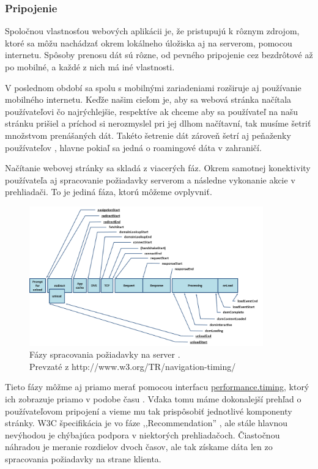 
\newpage
\subsubsection{Pripojenie} %
\label{ssub:pripojenie}

Spoločnou vlastnosťou webových aplikácii je, že pristupujú k rôznym zdrojom, ktoré sa môžu nachádzať okrem lokálneho úložiska aj na serverom, pomocou internetu. Spôsoby prenosu dát sú rôzne, od pevného pripojenie cez bezdrôtové až po mobilné, a každé z nich má iné vlastnosti.

V poslednom období sa spolu s mobilnými zariadeniami rozširuje aj používanie mobilného internetu. Keďže našim cieľom je, aby sa webová stránka načítala používateľovi čo najrýchlejšie, respektíve ak chceme aby sa používateľ na našu stránku prišiel a príchod si nerozmyslel pri jej dlhom načítavní, tak musíme šetriť množstvom prenášaných dát. Takéto šetrenie dát zároveň šetrí aj peňaženky používateľov \cite{performance}, hlavne pokiaľ sa jedná o roamingové dáta v zahraničí.

Načítanie webovej stránky sa skladá z viacerých fáz. Okrem samotnej konektivity používateľa aj spracovanie požiadavky serverom a následne vykonanie akcie v prehliadači. To je jediná fáza, ktorú môžeme ovplyvniť.

\begin{figure}[H]
	\centering
	\includegraphics[width=0.9\textwidth]{img/w3c-timing-overview.png}
	\caption[Fázy spracovania požiadavky na server]{
		Fázy spracovania požiadavky na server \cite{timing}.\\
		Prevzaté z http://www.w3.org/TR/navigation-timing/}
	\label{fig: timing}
\end{figure}

Tieto fázy môžme aj priamo merať pomocou interfacu \url{performance.timing}, ktorý ich zobrazuje priamo v podobe času \cite{1000ms, performancebrowsernetworking}. Vďaka tomu máme dokonalejší prehľad o používateľovom pripojení a vieme mu tak prispôsobiť jednotlivé komponenty stránky. W3C špecifikácia je vo fáze ,,Recommendation'' \cite{timing}, ale stále hlavnou nevýhodou je chýbajúca podpora v niektorých prehliadačoch. Čiastočnou náhradou je meranie rozdielov dvoch časov, ale tak získame dáta len zo spracovania požiadavky na strane klienta.

